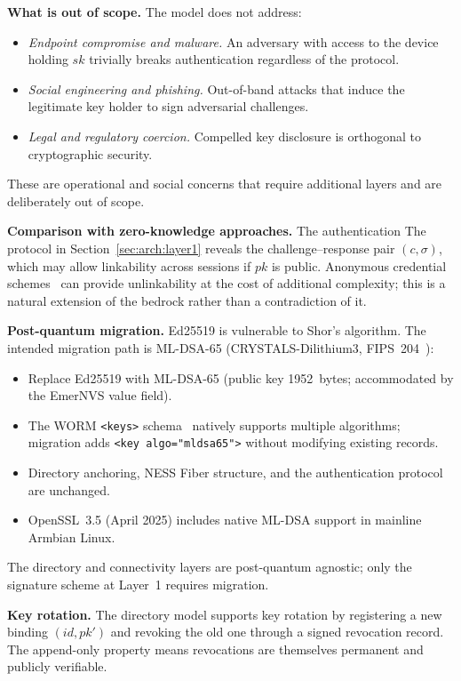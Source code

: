 \documentclass[11pt,a4paper]{article}
\begin{document}
\textbf{What is out of scope.}  The model does not address:
\begin{itemize}[leftmargin=*]
  \item \emph{Endpoint compromise and malware.}  An adversary with access to
    the device holding $sk$ trivially breaks authentication regardless of
    the protocol.
  \item \emph{Social engineering and phishing.}  Out-of-band attacks that
    induce the legitimate key holder to sign adversarial challenges.
  \item \emph{Legal and regulatory coercion.}  Compelled key disclosure is
    orthogonal to cryptographic security.
\end{itemize}
These are operational and social concerns that require additional layers and
are deliberately out of scope.

\textbf{Comparison with zero-knowledge approaches.}  The authentication
The protocol in Section~\ref{sec:arch:layer1} reveals the challenge--response pair $(c, \sigma)$,
which may allow linkability across sessions if $pk$ is public.  Anonymous
credential schemes~\cite{goldreich2001} can provide unlinkability at the cost
of additional complexity; this is a natural extension of the bedrock rather
than a contradiction of it.

\textbf{Post-quantum migration.}  Ed25519 is vulnerable to Shor's algorithm.
The intended migration path is ML-DSA-65 (CRYSTALS-Dilithium3,
FIPS~204~\cite{fips204}):
\begin{itemize}[leftmargin=*]
  \item Replace Ed25519 with ML-DSA-65 (public key 1952~bytes; accommodated
    by the EmerNVS value field).
  \item The WORM \texttt{<keys>} schema~\cite{worm} natively supports multiple
    algorithms; migration adds \texttt{<key algo="mldsa65">} without
    modifying existing records.
  \item Directory anchoring, NESS Fiber structure, and the authentication
    protocol are unchanged.
  \item OpenSSL~3.5 (April 2025) includes native ML-DSA support in mainline
    Armbian Linux.
\end{itemize}
The directory and connectivity layers are post-quantum agnostic; only the
signature scheme at Layer~1 requires migration.

\textbf{Key rotation.}  The directory model supports key rotation by
registering a new binding $(id, pk')$ and revoking the old one through a
signed revocation record.  The append-only property means revocations are
themselves permanent and publicly verifiable.
\end{document}
